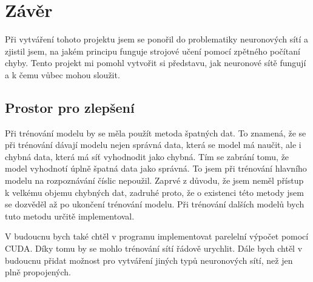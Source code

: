\section{Závěr}
Při vytváření tohoto projektu jsem se ponořil do problematiky neuronových sítí a zjistil jsem, na jakém principu funguje strojové učení pomocí zpětného počítaní chyby.
Tento projekt mi pomohl vytvořit si představu, jak neuronové sítě fungují a k čemu vůbec mohou sloužit.

\subsection{Prostor pro zlepšení}
Při trénování modelu by se měla použít metoda špatných dat. To znamená, že se při trénování dávají modelu nejen správná data,
která se model má naučit, ale i chybná data, která má síť vyhodnodit jako chybná. Tím se zabrání tomu, že model vyhodnotí úplně špatná data jako správná.
To jsem při trénování hlavního modelu na rozpoznávání číslic nepoužil.
Zaprvé z důvodu, že jsem neměl přístup k velkému objemu chybných dat, zadruhé proto, že o existenci této metody jsem se dozvěděl až po ukončení trénování modelu.
Při trénování dalších modelů bych tuto metodu určitě implementoval.

V budoucnu bych také chtěl v programu implementovat parelelní výpočet pomocí CUDA. Díky tomu by se mohlo trénování sítí řádově urychlit.
Dále bych chtěl v budoucnu přidat možnost pro vytváření jiných typů neuronových sítí, než jen plně propojených.